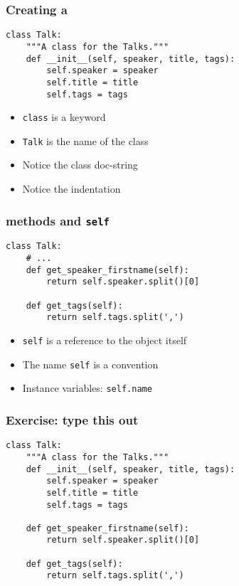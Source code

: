 \documentclass[14pt,compress,aspectratio=169]{beamer}
\begin{document}
\begin{frame}[fragile]
  \frametitle{Creating a }
  \begin{lstlisting}
class Talk:
    """A class for the Talks."""
    def __init__(self, speaker, title, tags):
        self.speaker = speaker
        self.title = title
        self.tags = tags
  \end{lstlisting}
  \begin{itemize}
  \item \lstinline{class} is a keyword
  \item \lstinline{Talk} is the name of the class
  \item Notice the class doc-string
  \item Notice the indentation
  \end{itemize}
\end{frame}

\begin{frame}[fragile]
  \frametitle{methods and \lstinline{self}}
  \begin{lstlisting}
class Talk:
    # ...
    def get_speaker_firstname(self):
        return self.speaker.split()[0]

    def get_tags(self):
        return self.tags.split(',')
  \end{lstlisting}
  \begin{itemize}
  \item \lstinline{self} is a reference to the object itself
  \item The name \lstinline{self} is a convention
  \item Instance variables: \lstinline{self.name}
  \end{itemize}
\end{frame}

\begin{frame}
  \frametitle{Exercise: type this out}
  \vspace*{-0.1in}
  \begin{lstlisting}
class Talk:
    """A class for the Talks."""
    def __init__(self, speaker, title, tags):
        self.speaker = speaker
        self.title = title
        self.tags = tags

    def get_speaker_firstname(self):
        return self.speaker.split()[0]

    def get_tags(self):
        return self.tags.split(',')
  \end{lstlisting}
\end{frame}
\end{document}
